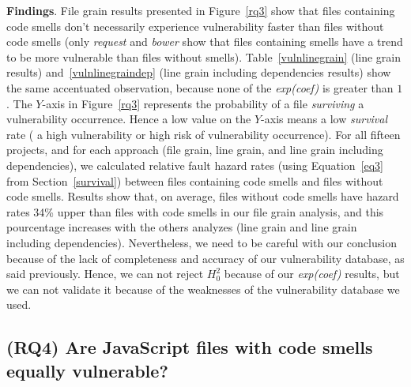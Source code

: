 {\textbf{Findings}. File grain results presented in Figure~\ref{rq3} show that files containing code smells don't necessarily experience vulnerability faster than files without code smells (only \textsl{request} and \textsl{bower} show that files containing smells have a trend to be more vulnerable than files without smells). Table~\ref{vulnlinegrain} (line grain results) and~\ref{vulnlinegraindep} (line grain including dependencies results) show the same accentuated observation, because none of the \textsl{exp(coef)} is greater than $1$. The $Y$-axis in Figure~\ref{rq3} represents the probability of a file \emph{surviving} a vulnerability occurrence. Hence a low value on the $Y$-axis means a low \emph{survival} rate (\ie{} a high vulnerability or high risk of vulnerability occurrence).  
For all fifteen projects, and for each approach (file grain, line grain, and line grain including dependencies), we calculated relative fault hazard rates (using Equation~\ref{eq3} from Section~\ref{survival}) between files containing code smells and files without code smells. Results show that, on average, files without code smells have hazard rates 34\% upper than files with code smells in our file grain analysis, and this pourcentage increases with the others analyzes (line grain and line grain including dependencies). Nevertheless, we need to be careful with our conclusion because of the lack of completeness and accuracy of our vulnerability database, as said previously. Hence, we can not reject $H^{2}_{0}$ because of our \textsl{exp(coef)} results, but we can not validate it because of the weaknesses of the vulnerability database we used.


\subsection*{(RQ4) Are JavaScript files with code smells equally vulnerable?}

}
